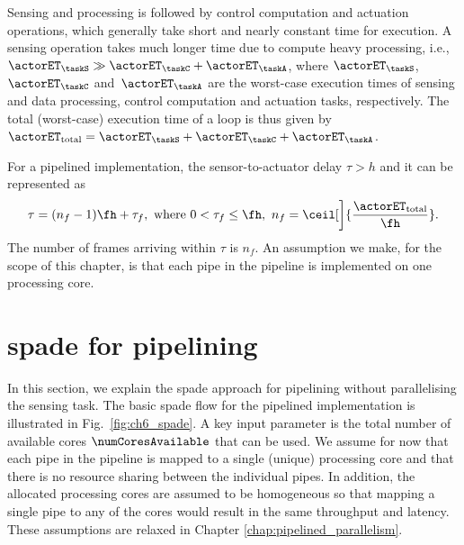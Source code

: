 Sensing and processing is followed by control computation and actuation operations, which generally take short and nearly constant time for execution.
A sensing operation takes much longer time due to compute heavy processing, i.e., ${\actorET_{\taskS} \gg \actorET_\taskC+\actorET_\taskA}$, where $\actorET_\taskS$, $\actorET_\taskC$ and~$\actorET_\taskA$ are the worst-case execution times of sensing and data processing, control computation and actuation tasks, respectively. 
The total (worst-case) execution time of a loop is thus given by ${\actorET_{\text{total}} = \actorET_\taskS+\actorET_\taskC+\actorET_\taskA}$. 

For a pipelined implementation, the sensor-to-actuator delay $\tau > h$ and it can be represented as~\cite{aastrom2013computer}
\begin{equation}
     \tau = (n_{f}-1)\fh+\tau_f,\text{ where } 0<\tau_f\le \fh,\ n_f =\ceil[\bigg]{\frac{\actorET_{\text{total}}}{\fh}}. \label{eq:ch6_pipe_tau}
\end{equation}
The number of frames arriving within $\tau$ is $n_f$. An assumption we make, for the scope of this chapter, is that each pipe in the pipeline is implemented on one processing core.

\section{\texorpdfstring{\Gls{spade}}{SPADe} for pipelining}
In this section, we explain the \gls{spade} approach for pipelining without parallelising the sensing task. 
The basic \gls{spade} flow for the pipelined implementation is illustrated in Fig.\ \ref{fig:ch6_spade}. A key input parameter is the total number of available cores $\numCoresAvailable$ that can be used.
We assume for now that each pipe in the pipeline is mapped to a single (unique) processing core and that there is no resource sharing between the individual pipes.
In addition, the allocated processing cores are assumed to be homogeneous so that mapping a single pipe to any of the cores would result in the same throughput and latency.
These assumptions are relaxed in Chapter \ref{chap:pipelined_parallelism}.

